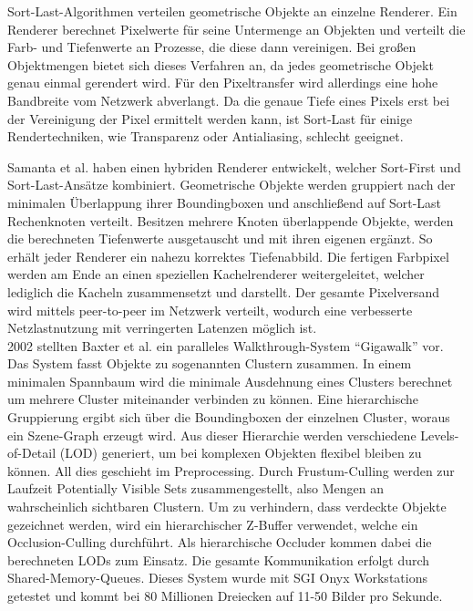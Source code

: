Sort-Last-Algorithmen verteilen geometrische Objekte an einzelne Renderer. Ein Renderer berechnet Pixelwerte für seine Untermenge an Objekten und verteilt die Farb- und Tiefenwerte an Prozesse, die diese dann vereinigen. Bei großen Objektmengen bietet sich dieses Verfahren an, da jedes geometrische Objekt genau einmal gerendert wird. Für den Pixeltransfer wird allerdings eine hohe Bandbreite vom Netzwerk abverlangt. Da die genaue Tiefe eines Pixels erst bei der Vereinigung der Pixel ermittelt werden kann, ist Sort-Last für einige Rendertechniken, wie Transparenz oder Antialiasing, schlecht geeignet.

Samanta et al. \cite{samanta} haben einen hybriden Renderer entwickelt, welcher Sort-First und Sort-Last-Ansätze kombiniert. Geometrische Objekte werden gruppiert nach der minimalen Überlappung ihrer Boundingboxen und anschließend auf Sort-Last Rechenknoten verteilt. Besitzen mehrere Knoten überlappende Objekte, werden die berechneten Tiefenwerte ausgetauscht und mit ihren eigenen ergänzt. So erhält jeder Renderer ein nahezu korrektes Tiefenabbild. Die fertigen Farbpixel werden am Ende an einen speziellen Kachelrenderer weitergeleitet, welcher lediglich die Kacheln zusammensetzt und darstellt. Der gesamte Pixelversand wird mittels peer-to-peer im Netz\-werk verteilt, wodurch eine verbesserte Netzlastnutzung mit verringerten Latenzen möglich ist.\\
2002 stellten Baxter et al. \cite{baxter} ein paralleles Walkthrough-System "`Gigawalk"' vor. Das System fasst Objekte zu sogenannten Clustern zusammen. In einem minimalen Spannbaum wird die minimale Ausdehnung eines Clusters berechnet um mehrere Cluster miteinander verbinden zu können. Eine hierarchische Gruppierung ergibt sich über die Boundingboxen der einzelnen Cluster, woraus ein Szene-Graph erzeugt wird. Aus dieser Hierarchie werden verschiedene Levels-of-Detail (LOD)\cite{hlod} generiert, um bei komplexen Objekten flexibel bleiben zu können. All dies geschieht im Preprocessing. Durch Frustum-Culling werden zur Laufzeit Potentially Visible Sets \cite{RTR3} zusammengestellt, also Mengen an wahrscheinlich sichtbaren Clustern. Um zu verhindern, dass verdeckte Objekte gezeichnet werden, wird ein hierarchischer Z-Buffer verwendet, welche ein Occlusion-Culling durchführt. Als hierarchische Occluder kommen dabei die berechneten LODs zum Einsatz. Die gesamte Kommunikation erfolgt durch Shared-Memory-Queues. Dieses System wurde mit SGI Onyx Workstations getestet und kommt bei 80 Millionen Dreiecken auf 11-50 Bilder pro Sekunde.\\

